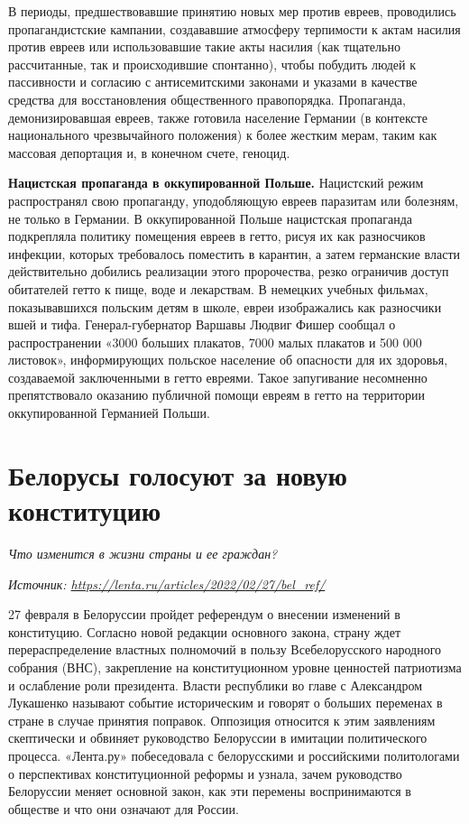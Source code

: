 В периоды, предшествовавшие принятию новых мер против евреев, проводились пропагандистские кампании, создававшие атмосферу терпимости к актам насилия против евреев или использовавшие такие акты насилия (как тщательно рассчитанные, так и происходившие спонтанно), чтобы побудить людей к пассивности и согласию с антисемитскими законами и указами в качестве средства для восстановления общественного правопорядка. Пропаганда, демонизировавшая евреев, также готовила население Германии (в контексте национального чрезвычайного положения) к более жестким мерам, таким как массовая депортация и, в конечном счете, геноцид.

\textbf{Нацистская пропаганда в оккупированной Польше.} Нацистский режим распространял свою пропаганду, уподобляющую евреев паразитам или болезням, не только в Германии. В оккупированной Польше нацистская пропаганда подкрепляла политику помещения евреев в гетто, рисуя их как разносчиков инфекции, которых требовалось поместить в карантин, а затем германские власти действительно добились реализации этого пророчества, резко ограничив доступ обитателей гетто к пище, воде и лекарствам. В немецких учебных фильмах, показывавшихся польским детям в школе, евреи изображались как разносчики вшей и тифа. Генерал-губернатор Варшавы Людвиг Фишер сообщал о распространении «3000 больших плакатов, 7000 малых плакатов и 500 000 листовок», информирующих польское население об опасности для их здоровья, создаваемой заключенными в гетто евреями. Такое запугивание несомненно препятствовало оказанию публичной помощи евреям в гетто на территории оккупированной Германией Польши.


\clearpage


\section{Белорусы голосуют за новую конституцию}

\textit{Что изменится в жизни страны и ее граждан?}

\textit{Источник: \url{https://lenta.ru/articles/2022/02/27/bel_ref/}}

27 февраля в Белоруссии пройдет референдум о внесении изменений в конституцию. Согласно новой редакции основного закона, страну ждет перераспределение властных полномочий в пользу Всебелорусского народного собрания (ВНС), закрепление на конституционном уровне ценностей патриотизма и ослабление роли президента. Власти республики во главе с Александром Лукашенко называют событие историческим и говорят о больших переменах в стране в случае принятия поправок. Оппозиция относится к этим заявлениям скептически и обвиняет руководство Белоруссии в имитации политического процесса. «Лента.ру» побеседовала с белорусскими и российскими политологами о перспективах конституционной реформы и узнала, зачем руководство Белоруссии меняет основной закон, как эти перемены воспринимаются в обществе и что они означают для России.

